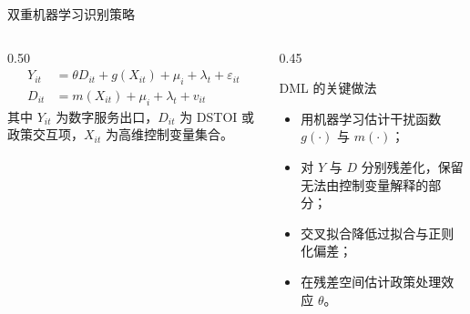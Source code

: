 \documentclass[aspectratio=169,10pt]{ctexbeamer}
\begin{document}
\begin{frame}{双重机器学习识别策略}
  \begin{columns}[T,totalwidth=\textwidth]
    \begin{column}{0.50\textwidth}
      \begin{align*}
        Y_{it} &= \theta D_{it}+g(X_{it})+\mu_i+\lambda_t+\varepsilon_{it} \\
        D_{it} &= m(X_{it})+\mu_i+\lambda_t+v_{it}
      \end{align*}
      \small
      其中 $Y_{it}$ 为数字服务出口，$D_{it}$ 为 DSTOI 或政策交互项，$X_{it}$ 为高维控制变量集合。
    \end{column}
    \begin{column}{0.45\textwidth}
      \begin{block}{DML 的关键做法}
        \begin{itemize}
          \item 用机器学习估计干扰函数 $g(\cdot)$ 与 $m(\cdot)$；
          \item 对 $Y$ 与 $D$ 分别残差化，保留无法由控制变量解释的部分；
          \item 交叉拟合降低过拟合与正则化偏差；
          \item 在残差空间估计政策处理效应 $\theta$。
        \end{itemize}
      \end{block}
    \end{column}
  \end{columns}
\end{frame}
\end{document}
